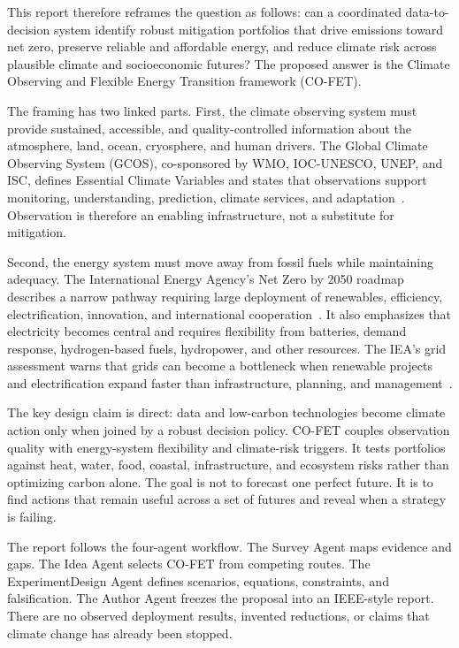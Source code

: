 \documentclass[conference]{IEEEtran}
\begin{document}
This report therefore reframes the question as follows: can a coordinated data-to-decision system identify robust mitigation portfolios that drive emissions toward net zero, preserve reliable and affordable energy, and reduce climate risk across plausible climate and socioeconomic futures? The proposed answer is the Climate Observing and Flexible Energy Transition framework (CO-FET).

The framing has two linked parts. First, the climate observing system must provide sustained, accessible, and quality-controlled information about the atmosphere, land, ocean, cryosphere, and human drivers. The Global Climate Observing System (GCOS), co-sponsored by WMO, IOC-UNESCO, UNEP, and ISC, defines Essential Climate Variables and states that observations support monitoring, understanding, prediction, climate services, and adaptation~\cite{gcos}. Observation is therefore an enabling infrastructure, not a substitute for mitigation.

Second, the energy system must move away from fossil fuels while maintaining adequacy. The International Energy Agency's Net Zero by 2050 roadmap describes a narrow pathway requiring large deployment of renewables, efficiency, electrification, innovation, and international cooperation~\cite{iea2021}. It also emphasizes that electricity becomes central and requires flexibility from batteries, demand response, hydrogen-based fuels, hydropower, and other resources. The IEA's grid assessment warns that grids can become a bottleneck when renewable projects and electrification expand faster than infrastructure, planning, and management~\cite{ieagrid}.

The key design claim is direct: data and low-carbon technologies become climate action only when joined by a robust decision policy. CO-FET couples observation quality with energy-system flexibility and climate-risk triggers. It tests portfolios against heat, water, food, coastal, infrastructure, and ecosystem risks rather than optimizing carbon alone. The goal is not to forecast one perfect future. It is to find actions that remain useful across a set of futures and reveal when a strategy is failing.

The report follows the four-agent workflow. The Survey Agent maps evidence and gaps. The Idea Agent selects CO-FET from competing routes. The ExperimentDesign Agent defines scenarios, equations, constraints, and falsification. The Author Agent freezes the proposal into an IEEE-style report. There are no observed deployment results, invented reductions, or claims that climate change has already been stopped.
\end{document}
